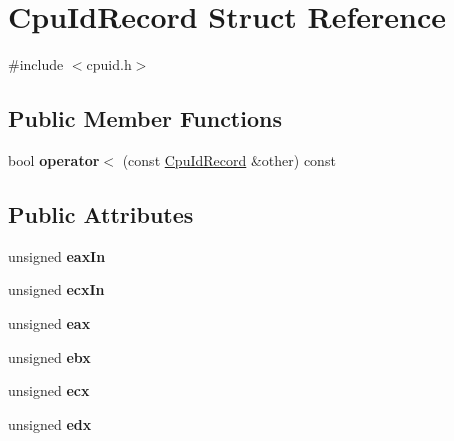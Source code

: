 \hypertarget{structCpuIdRecord}{\section{Cpu\-Id\-Record Struct Reference}
\label{structCpuIdRecord}
}


{\ttfamily \#include $<$cpuid.\-h$>$}

\subsection*{Public Member Functions}
\begin{DoxyCompactItemize}
\item 
\hypertarget{structCpuIdRecord_ac22508a164c283b85b40a5fd252bb717}{bool {\bfseries operator$<$} (const \hyperlink{structCpuIdRecord}{Cpu\-Id\-Record} \&other) const }\label{structCpuIdRecord_ac22508a164c283b85b40a5fd252bb717}

\end{DoxyCompactItemize}
\subsection*{Public Attributes}
\begin{DoxyCompactItemize}
\item 
\hypertarget{structCpuIdRecord_a29cb7064576934fde031217dc72748eb}{unsigned {\bfseries eax\-In}}\label{structCpuIdRecord_a29cb7064576934fde031217dc72748eb}

\item 
\hypertarget{structCpuIdRecord_a0550345b9fca22f5a71f562cf9aa798b}{unsigned {\bfseries ecx\-In}}\label{structCpuIdRecord_a0550345b9fca22f5a71f562cf9aa798b}

\item 
\hypertarget{structCpuIdRecord_a00980ac5f6f5843e58347584158bbfb3}{unsigned {\bfseries eax}}\label{structCpuIdRecord_a00980ac5f6f5843e58347584158bbfb3}

\item 
\hypertarget{structCpuIdRecord_a54bcb48b9c8c83ac59fc529a31b5090a}{unsigned {\bfseries ebx}}\label{structCpuIdRecord_a54bcb48b9c8c83ac59fc529a31b5090a}

\item 
\hypertarget{structCpuIdRecord_ac19e67764ed1acc358e9326582bbc82f}{unsigned {\bfseries ecx}}\label{structCpuIdRecord_ac19e67764ed1acc358e9326582bbc82f}

\item 
\hypertarget{structCpuIdRecord_a7e89950c616061d3031f1298eaf436d5}{unsigned {\bfseries edx}}\label{structCpuIdRecord_a7e89950c616061d3031f1298eaf436d5}

\end{DoxyCompactItemize}


